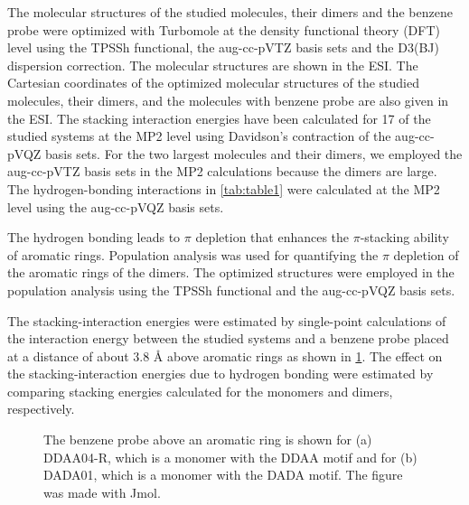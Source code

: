 \documentclass[twoside,twocolumn,9pt]{article}
\begin{document}
The molecular structures of the studied molecules, their dimers and the benzene
probe were optimized with Turbomole\cite{https://doi.org/10.1002/wcms.1162} at
the density functional theory (DFT) level using the TPSSh
functional\cite{doi:10.1063/1.1626543,doi:10.1063/1.1795692}, the aug-cc-pVTZ
basis sets\cite{B515623H,B508541A} and the D3(BJ) dispersion
correction\cite{doi:10.1063/1.3382344,https://doi.org/10.1002/jcc.21759}.  The
molecular structures are shown in the ESI\dag. The Cartesian coordinates of the
optimized molecular structures of the studied molecules, their dimers, and the
molecules with benzene probe are also given in the ESI\dag.  The stacking
interaction energies have been calculated for 17 of the studied systems at the
MP2 level using Davidson's contraction of the aug-cc-pVQZ basis
sets\cite{Dunning:89,doi:10.1063/1.456153,DAVIDSON1996514}. For the two largest
molecules and their dimers, we employed the aug-cc-pVTZ basis sets in the
MP2 calculations because the dimers are large.  The hydrogen-bonding
interactions in \cref{tab:table1} were calculated at the MP2 level using
the aug-cc-pVQZ basis sets\cite{doi:10.1063/1.1627293}.

The hydrogen bonding leads to $\pi$ depletion that enhances the $\pi$-stacking
ability of aromatic rings\cite{C2CC33886F}. Population analysis was used for
quantifying the $\pi$ depletion of the aromatic rings of the dimers. The
optimized structures were employed in the population analysis using
the TPSSh functional\cite{doi:10.1063/1.1626543,doi:10.1063/1.1795692} and
the aug-cc-pVQZ\cite{doi:10.1063/1.456153,DAVIDSON1996514} basis sets.

The stacking-interaction energies were estimated by single-point calculations
of the interaction energy between the studied systems and a benzene probe
placed at a distance of about 3.8 {\AA} above aromatic rings as shown in
\cref{fig:figure2}. The effect on the stacking-interaction energies due to
hydrogen bonding were estimated by comparing stacking energies calculated for
the monomers and dimers, respectively.  

\begin{figure}[H] \centering
{}  \hspace{2mm}
\caption{The benzene probe above an aromatic ring is shown for (a) DDAA04-R, which is a monomer with the DDAA motif and for (b) DADA01, which is a monomer 
with the DADA motif. The figure was made with Jmol\cite{jmol}.}
\label{fig:figure2} 
\end{figure}
\end{document}
